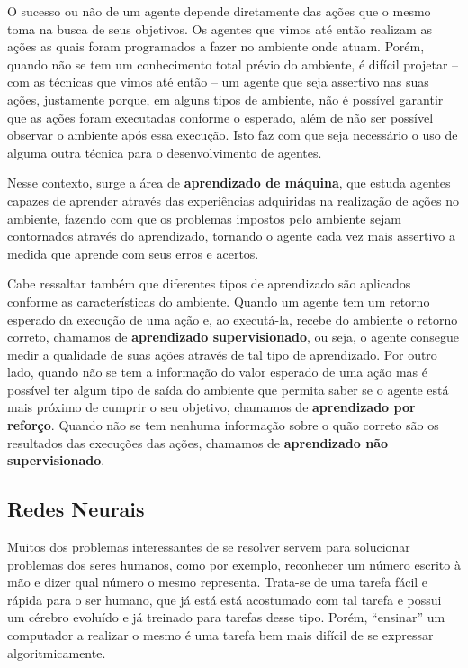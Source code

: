 O sucesso ou não de um agente depende diretamente das ações que o mesmo toma na
busca de seus objetivos. Os agentes que vimos até então realizam as ações as
quais foram programados a fazer no ambiente onde atuam. Porém, quando não se
tem um conhecimento total prévio do ambiente, é difícil projetar -- com as
técnicas que vimos até então -- um agente que seja assertivo nas suas ações,
justamente porque, em alguns tipos de ambiente, não é possível garantir que as
ações foram executadas conforme o esperado, além de não ser possível observar
o ambiente após essa execução. Isto faz com que seja necessário o uso de alguma
outra técnica para o desenvolvimento de agentes.

Nesse contexto, surge a área de \textbf{aprendizado de máquina}, que estuda
agentes capazes de aprender através das experiências adquiridas na realização de
ações no ambiente, fazendo com que os problemas impostos pelo ambiente sejam
contornados através do aprendizado, tornando o agente cada vez mais assertivo a
medida que aprende com seus erros e acertos.

Cabe ressaltar também que diferentes tipos de aprendizado são aplicados conforme
as características do ambiente. Quando um agente tem um retorno esperado da
execução de uma ação e, ao executá-la, recebe do ambiente o retorno correto,
chamamos de \textbf{aprendizado supervisionado}, ou seja, o agente consegue
medir a qualidade de suas ações através de tal tipo de aprendizado. Por outro
lado, quando não se tem a informação do valor esperado de uma ação mas é
possível ter algum tipo de saída do ambiente que permita saber se o agente está
mais próximo de cumprir o seu objetivo, chamamos de \textbf{aprendizado por
reforço}. Quando não se tem nenhuma informação sobre o quão correto são os
resultados das execuções das ações, chamamos de \textbf{aprendizado não
supervisionado}. \cite{Russell:1995:AIM:193191}

\subsection{Redes Neurais}

Muitos dos problemas interessantes de se resolver servem para solucionar
problemas dos seres humanos, como por exemplo, reconhecer um número escrito à
mão e dizer qual número o mesmo representa. Trata-se de uma tarefa fácil e
rápida para o ser humano, que já está está acostumado com tal tarefa e possui
um cérebro evoluído e já treinado para tarefas desse tipo. Porém, ``ensinar'' um
computador a realizar o mesmo é uma tarefa bem mais difícil de se expressar
algoritmicamente.

